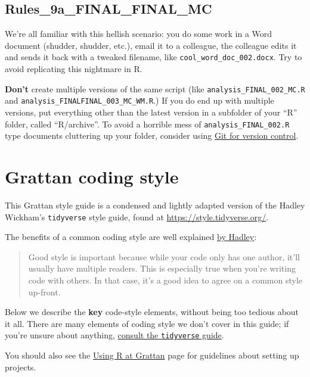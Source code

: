 \documentclass[]{book}
\begin{document}
\hypertarget{rules_9a_final_final_mc}{%
\section{Rules\_9a\_FINAL\_FINAL\_MC}\label{rules_9a_final_final_mc}}

We're all familiar with this hellish scenario: you do some work in a Word document (shudder, shudder, etc.), email it to a colleague, the colleague edits it and sends it back with a tweaked filename, like \texttt{cool\_word\_doc\_002.docx}. Try to avoid replicating this nightmare in R.

\textbf{Don't} create multiple versions of the same script (like \texttt{analysis\_FINAL\_002\_MC.R} and \texttt{analysis\_FINALFINAL\_003\_MC\_WM.R}.) If you do end up with multiple versions, put everything other than the latest version in a subfolder of your ``R'' folder, called ``R/archive''. To avoid a horrible mess of \texttt{analysis\_FINAL\_002.R} type documents cluttering up your folder, consider using \protect\hyperlink{version-control}{Git for version control}.

\hypertarget{grattan-coding-style}{%
\chapter{Grattan coding style}\label{grattan-coding-style}}

This Grattan style guide is a condensed and lightly adapted version of the Hadley Wickham's \texttt{tidyverse} style guide, found at \url{https://style.tidyverse.org/}.

The benefits of a common coding style are well explained \href{http://r-pkgs.had.co.nz/style.html}{by Hadley}:

\begin{quote}
Good style is important because while your code only has one author, it'll usually have multiple readers. This is especially true when you're writing code with others. In that case, it's a good idea to agree on a common style up-front.
\end{quote}

Below we describe the \textbf{key} code-style elements, without being too tedious about it all. There are many elements of coding style we don't cover in this guide; if you're unsure about anything, \href{https://style.tidyverse.org/}{consult the \texttt{tidyverse} guide}.

You should also see the \protect\hyperlink{organising-projects}{Using R at Grattan} page for guidelines about setting up projects.
\end{document}
